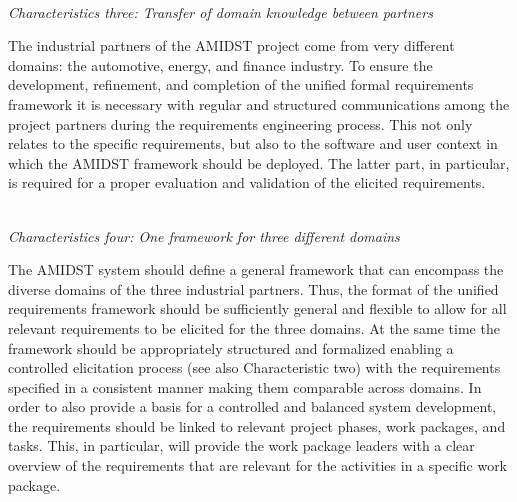 
\ \\
\noindent \emph{Characteristics three: Transfer of domain knowledge between  partners}
\label{sec:characteristic3}

The industrial partners of the AMIDST project come from very different domains: the automotive, energy, and finance
industry. To ensure the development, refinement, and completion of the unified formal requirements framework it is
necessary with regular and structured communications among the project partners during the requirements engineering
process. This not only relates to the specific requirements, but also to the software and user context in which the
AMIDST framework should be deployed. The latter part, in particular, is required for a proper evaluation and validation
of the elicited requirements.



\ \\
\noindent \emph{Characteristics four:  One framework for three different domains}
\label{sec:characteristic4}

The AMIDST system should define a general framework that can encompass the diverse domains of the three industrial
partners. Thus, the format of the unified requirements framework should be sufficiently general and flexible to
allow for all relevant requirements to be elicited for the three domains. At the same time the framework should be
appropriately structured and formalized enabling a controlled elicitation process (see also Characteristic two) with the
requirements specified in a consistent manner making them comparable across domains. In order to also provide a basis for a controlled and
balanced system development, the requirements should be linked to
relevant project phases, work packages, and tasks. This, in particular, will provide the work package leaders with
a clear overview of the requirements that are relevant for the activities in a specific work package.   

